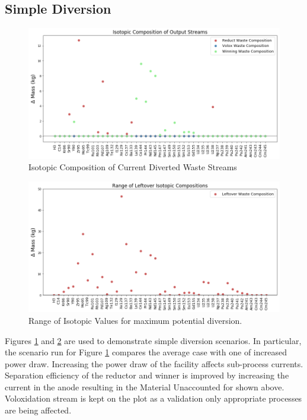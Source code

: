 \subsection{Simple Diversion}
\begin{figure} [h]
	\includegraphics[width=\linewidth]{images/current-isotope-comp}
	\caption{Isotopic Composition of Current Diverted Waste Streams}
	\label{fig:current-isotope-comp}
\end{figure}

\begin{figure} [h]
	\includegraphics[width=\linewidth]{images/isotopic-comp-range}
	\caption{Range of Isotopic Values for maximum potential diversion.}
	\label{fig:isotopic-range}
\end{figure}

Figures \ref{fig:current-isotope-comp} and \ref{fig:isotopic-range} are used to demonstrate simple diversion scenarios. In particular, the scenario run for Figure
\ref{fig:current-isotope-comp} compares the average case with one of increased power draw. Increasing the power draw of the facility affects sub-process currents.
Separation efficiency of the reductor and winner is improved by increasing the current in the anode resulting in the Material Unaccounted for shown above. Voloxidation stream
is kept on the plot as a validation only appropriate processes are being affected. 


